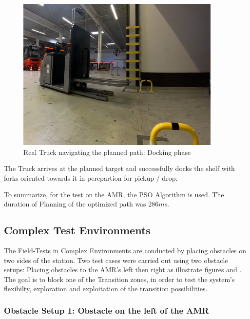 \begin{figure}[H]
    \begin{center}
        \includegraphics[width=4in]{images/Chap3/Test1_real_dock.png} %
        \caption{Real Truck navigating the planned path: Docking phase}
        \label{OptResult61}
        \end{center}    
\end{figure}

The Truck arrives at the planned target and successfully 
docks the shelf with forks oriented towards it in perepartion for
pickup / drop.

To summarize, for the test on the AMR, the PSO Algorithm is used. The duration of Planning of the optimized 
path was \(286ms\). 



\subsection{Complex Test Environments}
The Field-Tests in Complex Environments are conducted by placing obstacles on two sides of the 
station. 
Two test cases were carried out using two obstacle setups: Placing obstacles to the AMR's left then right
as illustrate figures  and . %
The goal is to block one of the Transition zones, in order to test the system's flexibilty,
exploration and exploitation of the transition possibilities.



\subsubsection{Obstacle Setup 1: Obstacle on the left of the AMR}

